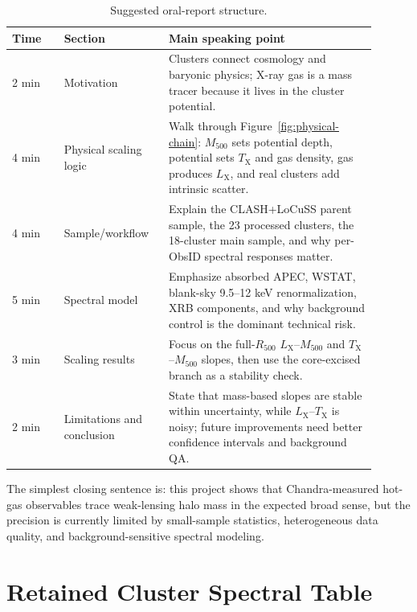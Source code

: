\documentclass[11pt]{article}
\newcommand{\Mfive}{\ensuremath{M_{500}}}
\newcommand{\Rfive}{\ensuremath{R_{500}}}
\newcommand{\Lx}{\ensuremath{L_{\mathrm{X}}}}
\newcommand{\Tx}{\ensuremath{T_{\mathrm{X}}}}
\begin{document}
\begin{table}[ht]
\centering
\caption{Suggested oral-report structure.}
\begin{tabular}{p{0.13\linewidth}p{0.25\linewidth}p{0.52\linewidth}}
\toprule
Time & Section & Main speaking point \\
\midrule
2 min & Motivation & Clusters connect cosmology and baryonic physics; X-ray gas is a mass tracer because it lives in the cluster potential. \\
4 min & Physical scaling logic & Walk through Figure~\ref{fig:physical-chain}: \Mfive{} sets potential depth, potential sets \Tx{} and gas density, gas produces \Lx{}, and real clusters add intrinsic scatter. \\
4 min & Sample/workflow & Explain the CLASH+LoCuSS parent sample, the 23 processed clusters, the 18-cluster main sample, and why per-ObsID spectral responses matter. \\
5 min & Spectral model & Emphasize absorbed APEC, WSTAT, blank-sky 9.5--12 keV renormalization, XRB components, and why background control is the dominant technical risk. \\
3 min & Scaling results & Focus on the full-\Rfive{} \Lx--\Mfive{} and \Tx--\Mfive{} slopes, then use the core-excised branch as a stability check. \\
2 min & Limitations and conclusion & State that mass-based slopes are stable within uncertainty, while \Lx--\Tx{} is noisy; future improvements need better confidence intervals and background QA. \\
\bottomrule
\end{tabular}
\end{table}

The simplest closing sentence is: this project shows that Chandra-measured hot-gas observables trace weak-lensing halo mass in the expected broad sense, but the precision is currently limited by small-sample statistics, heterogeneous data quality, and background-sensitive spectral modeling.

\section{Retained Cluster Spectral Table}
\end{document}
